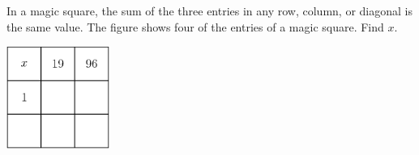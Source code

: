 In a magic square, the sum of the three entries in any row, column, or diagonal is the same value.  The figure shows four of the entries of a magic square.  Find $x.$

\begin{center}
\includegraphics[width = 33.6mm]{img/fig0.png}
\end{center}